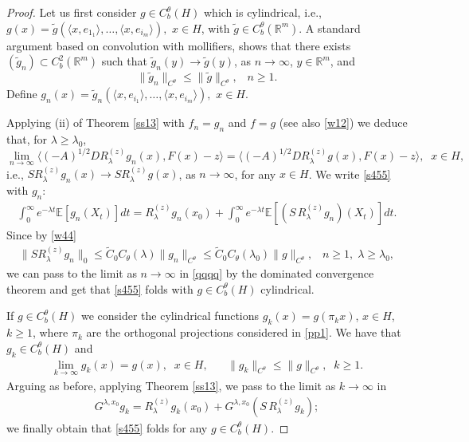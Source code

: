 \documentclass[preprint]{imsart}
\def\E{\mathbb E}
\def\R{\mathbb R}
\begin{document}
\begin{proof}
 \vskip 2mm
 
  
\vskip 1mm
Let us first consider $g \in  C^{\theta}_b(H)$ which is cylindrical, i.e.,
 $g(x) = \tilde g (\langle  x, e_{1_1}\rangle, \ldots, \langle  x, e_{i_m} \rangle),$ $x \in H$, with $\tilde g \in C^{\theta}_b(\R^m)$.
  A standard argument based on convolution with mollifiers, shows that there exists $(\tilde g_n) \subset C_b^2(\R^m)$ such that 
  $\tilde g_n (y) \to \tilde g(y)$,  as $n \to \infty$, $y \in \R^m$, and 
  $$
  \| \tilde g_n \|_{C^{\theta}} \le \| \tilde g \|_{C^{\theta}}, \;\;\; 
  n\ge 1. 
$$
 Define $g_n(x) = \tilde g_n (\langle  x, e_{i_1}\rangle, \ldots, \langle  x, e_{i_m} \rangle),$ $x \in H.$
  
  Applying  (ii) of Theorem \ref{ss13}  with $f_n = g_n$ and $f = g$ 
 (see also \eqref{w12}) we deduce that, for $\lambda \ge \lambda_0$,  
 \begin{equation}
\label{w122} 
\lim_{n \to \infty} \langle (-A)^{1/2} D  R^{(z)}_{\lambda} g_n (x) , F(x) -z\rangle =
  \langle (-A)^{1/2}   D R^{(z)}_{\lambda} g (x) , F(x) -z\rangle,\;\; x \in H, 
\end{equation} 
i.e.,  $S R^{(z)}_{\lambda}g_n(x) \to S R^{(z)}_{\lambda}g(x)$, as $n \to \infty$, for any $x \in H$. We write  \eqref{s455}  with  $g_n$:
\begin{gather} \label{qqqq}
\int_0^{\infty} e^{-\lambda t} \E[g_n(X_t)] dt
  =  R^{(z)}_{\lambda}  g_n(x_0) + 
  \int_0^{\infty} e^{-\lambda t} \E[
    (S \, R^{(z)}_{\lambda} g_n) (X_t)] dt.
\end{gather} 
Since by \eqref{w44}
 \begin{gather*}
 \| S R^{(z)}_{\lambda}g_n \|_0 \le \tilde C_0 C_{\theta}(\lambda) \| g_n\|_{C^{\theta}} \le  \tilde C_0 C_{\theta}(\lambda_0) \| g\|_{C^{\theta}},\; \;\; n \ge 1, \; \lambda \ge \lambda_0, 
\end{gather*}
we can pass to the limit as $n \to \infty$ in \eqref{qqqq} 
 by the dominated convergence theorem and  get that   
 \eqref{s455} folds with $g \in C^{\theta}_b(H)$  cylindrical.
   
If $g \in C^{\theta}_b(H)$ we consider the cylindrical functions $g_k(x) = g(\pi_k x)$,  $x \in H$, $k \ge 1$, where $\pi_k$ are the orthogonal projections considered in \eqref{pp1}. We have that $g_k \in C^{\theta}_b(H)$ and 
\begin{gather*}
\lim_{k \to \infty} g_k(x) = g(x),\;\; x \in H,\;\;\;\;\;\; \| g_k\|_{C^{\theta}}
 \le \| g \|_{C^{\theta}},\;\; k \ge 1.
\end{gather*}
Arguing as before, applying   Theorem \ref{ss13}, we pass to the limit as $k \to \infty$ in
\begin{gather*}
 G^{\lambda,x_0} g_k =  R^{(z)}_{\lambda}  g_k(x_0) + G^{\lambda,x_0} (S \, R^{(z)}_{\lambda} g_k); 
\end{gather*}
we finally obtain that  
\eqref{s455} folds for any  $g \in C^{\theta}_b(H)$.
 

\end{proof}
\end{document}
